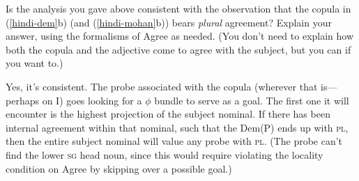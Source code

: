 \documentclass[11pt,a4paper]{article}
\def\refex#1{(\ref{#1})}
\renewcommand{\refex}[2][]{(\ref{#2}#1)}
\begin{document}
\ex[lingstyle=Q] Is the analysis you gave above consistent with the observation that the copula in \refex[b]{hindi-dem} (and \refex[b]{hindi-mohan}) bears \textit{plural} agreement? Explain your answer, using the formalisms of Agree as needed. (You don't need to explain how both the copula and the adjective come to agree with the subject, but you can if you want to.)
\xe
\begin{answer}
Yes, it's consistent. The probe associated with the copula (wherever that is---perhaps on I) goes looking for a $\phi$ bundle to serve as a goal. The first one it will encounter is the highest projection of the subject nominal. If there has been internal agreement within that nominal, such that the Dem(P) ends up with \textsc{pl}, then the entire subject nominal will value any probe with \textsc{pl}. (The probe can't find the lower \textsc{sg} head noun, since this would require violating the locality condition on Agree by skipping over a possible goal.)
\end{answer}
\end{document}
